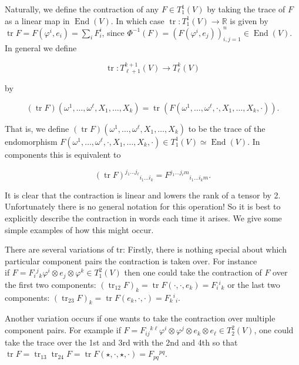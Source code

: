 \documentclass[10pt, letterpaper]{article}
\begin{document}
Naturally, we define the contraction of any $F \in T_{1}^{1}(V)$ by taking the trace of $F$ as a linear map in $\operatorname{End}(V)$. In which case $\operatorname{tr}: T_{1}^{1}(V) \rightarrow \mathbb{R}$ is given by $\operatorname{tr} F=F\left(\varphi^{i}, e_{i}\right)=\sum_{i} F_{i}^{i}$, since $\Phi^{-1}(F)=\left(F\left(\varphi^{i}, e_{j}\right)\right)_{i, j=1}^{n} \in \operatorname{End}(V)$. In general we define

$$
\operatorname{tr}: T_{\ell+1}^{k+1}(V) \rightarrow T_{\ell}^{k}(V)
$$

by

$$
(\operatorname{tr} F)\left(\omega^{1}, \ldots, \omega^{\ell}, X_{1}, \ldots, X_{k}\right)=\operatorname{tr}\left(F\left(\omega^{1}, \ldots, \omega^{\ell}, \cdot, X_{1}, \ldots, X_{k}, \cdot\right)\right) .
$$

That is, we define $(\operatorname{tr} F)\left(\omega^{1}, \ldots, \omega^{\ell}, X_{1}, \ldots, X_{k}\right)$ to be the trace of the endomorphism $F\left(\omega^{1}, \ldots, \omega^{\ell}, \cdot, X_{1}, \ldots, X_{k}, \cdot\right) \in T_{1}^{1}(V) \simeq \operatorname{End}(V)$. In components this is equivalent to

$$
(\operatorname{tr} F)^{j_{1} \ldots j_{\ell}}{ }_{i_{1} \ldots i_{k}}=F^{j_{1} \ldots j_{\ell} m}{ }_{i_{1} \ldots i_{k} m} .
$$

It is clear that the contraction is linear and lowers the rank of a tensor by 2. Unfortunately there is no general notation for this operation! So it is best to explicitly describe the contraction in words each time it arises. We give some simple examples of how this might occur.

There are several variations of tr: Firstly, there is nothing special about which particular component pairs the contraction is taken over. For instance\\
if $F=F_{i}{ }^{j}{ }_{k} \varphi^{i} \otimes e_{j} \otimes \varphi^{k} \in T_{1}^{2}(V)$ then one could take the contraction of $F$ over the first two components: $\left(\operatorname{tr}_{12} F\right)_{k}=\operatorname{tr} F\left(\cdot, \cdot, e_{k}\right)=F_{i}{ }^{i}{ }_{k}$ or the last two components: $\left(\operatorname{tr}_{23} F\right)_{k}=\operatorname{tr} F\left(e_{k}, \cdot, \cdot\right)=F_{k}{ }^{i}{ }_{i}$.

Another variation occurs if one wants to take the contraction over multiple component pairs. For example if $F=F_{i j}{ }^{k \ell} \varphi^{i} \otimes \varphi^{j} \otimes e_{k} \otimes e_{\ell} \in T_{2}^{2}(V)$, one could take the trace over the 1st and 3rd with the 2nd and 4th so that $\operatorname{tr} F=\operatorname{tr}_{13} \operatorname{tr}_{24} F=\operatorname{tr} F(\star, \cdot, \star, \cdot)=F_{p q}{ }^{p q}$.
\end{document}
